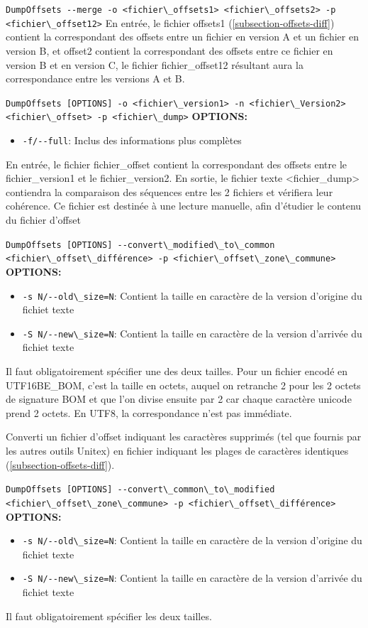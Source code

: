 \bigskip
\verb+DumpOffsets --merge -o <fichier\_offsets1> <fichier\_offsets2> -p <fichier\_offset12>+
En entrée, le fichier offsets1 (\ref{subsection-offsets-diff}) contient la correspondant des offsets entre un fichier en version A
et un fichier en version B, et offset2 contient la correspondant des offsets entre ce fichier en version B
et en version C, le fichier fichier\_offset12 résultant aura la correspondance entre les versions A et B.

\bigskip
\verb+DumpOffsets [OPTIONS] -o <fichier\_version1> -n <fichier\_Version2> <fichier\_offset> -p <fichier\_dump>+
\bigskip
\noindent \textbf{OPTIONS:}
\begin{itemize}
\item \verb+-f/--full+: Inclus des informations plus complètes
\end{itemize}

En entrée, le fichier fichier\_offset contient la correspondant des offsets entre le fichier\_version1 et le
fichier\_version2. En sortie, le fichier texte <fichier\_dump> contiendra la comparaison des séquences entre les
2 fichiers et vérifiera leur cohérence. Ce fichier est destinée à une lecture manuelle, afin d'étudier le contenu
du fichier d'offset


\bigskip
\verb+DumpOffsets [OPTIONS] --convert\_modified\_to\_common <fichier\_offset\_différence> -p <fichier\_offset\_zone\_commune>+
\bigskip
\noindent \textbf{OPTIONS:}
\begin{itemize}
\item \verb+-s N/--old\_size=N+: Contient la taille en caractère de la version d'origine du fichiet texte
\item \verb+-S N/--new\_size=N+: Contient la taille en caractère de la version d'arrivée du fichiet texte
\end{itemize}
Il faut obligatoirement spécifier une des deux tailles. Pour un fichier encodé en UTF16BE\_BOM, c’est la taille en
octets, auquel on retranche 2 pour les 2 octets de signature BOM et que l’on divise ensuite par 2 car chaque
caractère unicode prend 2 octets. En UTF8, la correspondance n’est pas immédiate.

Converti un fichier d'offset indiquant les caractères supprimés (tel que fournis par les autres outils Unitex) en fichier
indiquant les plages de caractères identiques (\ref{subsection-offsets-diff}).

\bigskip
\verb+DumpOffsets [OPTIONS] --convert\_common\_to\_modified <fichier\_offset\_zone\_commune> -p <fichier\_offset\_différence>+
\bigskip
\noindent \textbf{OPTIONS:}
\begin{itemize}
\item \verb+-s N/--old\_size=N+: Contient la taille en caractère de la version d'origine du fichiet texte
\item \verb+-S N/--new\_size=N+: Contient la taille en caractère de la version d'arrivée du fichiet texte
\end{itemize}
Il faut obligatoirement spécifier les deux tailles.

